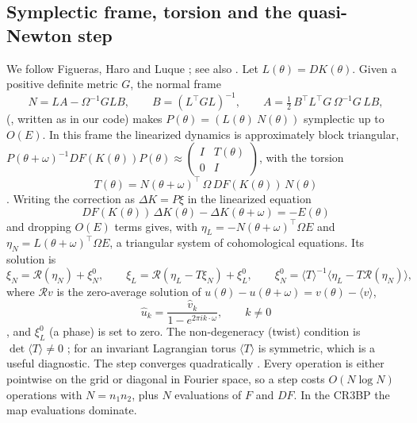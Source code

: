 \documentclass[11pt]{article}
\newcommand{\avg}[1]{\langle #1 \rangle}
\begin{document}
\subsection{Symplectic frame, torsion and the quasi-Newton step}
We follow Figueras, Haro and Luque \cite{figueras2017rigorous}; see also
\cite{haroluque2016ch4,haro2016book}. Let $L(\theta)=DK(\theta)$. Given a positive definite
metric $G$, the normal frame
\begin{equation}\label{eq:frame}
N = L A - \Omega^{-1} G L B, \qquad B = \left(L^\top G L\right)^{-1}, \qquad
A = \tfrac12\, B^\top L^\top G\, \Omega^{-1} G\, L B ,
\end{equation}
(\cite[eq.~(32), p.~14]{haromondelo2021flow}, written as in our code) makes
$P(\theta)=(L(\theta)\ N(\theta))$ symplectic up to $O(E)$. In this frame the linearized dynamics
is approximately block triangular,
$P(\theta+\omega)^{-1} DF(K(\theta)) P(\theta) \approx
\left(\begin{smallmatrix} I & T(\theta)\\ 0 & I\end{smallmatrix}\right)$, with the torsion
\begin{equation}\label{eq:torsion}
T(\theta) = N(\theta+\omega)^\top\, \Omega\, DF(K(\theta))\, N(\theta)
\end{equation}
\cite[eqs.~(8)--(13), p.~6]{figueras2017rigorous}. Writing the correction as
$\Delta K = P\xi$ in the linearized equation
\cite[eq.~(25), p.~9]{figueras2017rigorous}
\begin{equation}\label{eq:lin}
DF(K(\theta))\,\Delta K(\theta) - \Delta K(\theta+\omega) = -E(\theta)
\end{equation}
and dropping $O(E)$ terms gives, with
$\eta_L = -N(\theta+\omega)^\top\Omega E$ and $\eta_N = L(\theta+\omega)^\top\Omega E$, a
triangular system of cohomological equations. Its solution is
\cite[Lemma~2.9, eqs.~(32)--(34), p.~10]{figueras2017rigorous}
\begin{equation}\label{eq:xi}
\xi_N = \mathcal{R}(\eta_N) + \xi_N^0, \qquad
\xi_L = \mathcal{R}(\eta_L - T\xi_N) + \xi_L^0, \qquad
\xi_N^0 = \avg{T}^{-1}\avg{\eta_L - T\mathcal{R}(\eta_N)},
\end{equation}
where $\mathcal{R}v$ is the zero-average solution of $u(\theta)-u(\theta+\omega) = v(\theta)-\avg{v}$,
\begin{equation}\label{eq:cohom}
\widehat{u}_k = \frac{\widehat{v}_k}{1-e^{2\pi i k\cdot\omega}}, \qquad k\neq 0
\end{equation}
\cite[eq.~(20), p.~7]{figueras2017rigorous}, and $\xi_L^0$ (a phase) is set to zero. The
non-degeneracy (twist) condition is $\det\avg{T}\neq 0$ \cite[Lemma~2.9, p.~10]{figueras2017rigorous};
for an invariant Lagrangian torus $\avg{T}$ is symmetric, which is a useful diagnostic. The step
converges quadratically \cite[Lemma~2.8, eq.~(31), p.~10]{figueras2017rigorous}. Every operation
is either pointwise on the grid or diagonal in Fourier space, so a step costs $O(N\log N)$
operations with $N=n_1n_2$, plus $N$ evaluations of $F$ and $DF$. In the CR3BP the map
evaluations dominate.
\end{document}
